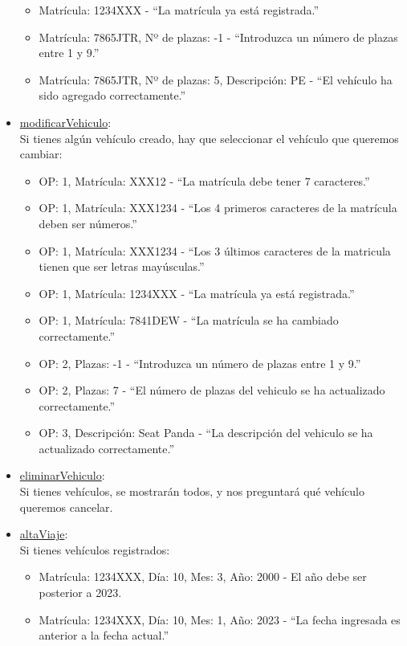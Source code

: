 \begin{itemize}
\begin{itemize}
    \item Matrícula: 1234XXX - “La matrícula ya está registrada.”
    \item Matrícula: 7865JTR, Nº de plazas: -1 - “Introduzca un número de plazas entre 1 y 9.”
    \item Matrícula: 7865JTR, Nº de plazas: 5, Descripción: PE - “El vehículo ha sido agregado correctamente.”
  \end{itemize}
  \item \href{DOC_DOXYGEN/modificar_8c_source.html}{modificarVehiculo}:\\
  Si tienes algún vehículo creado, hay que seleccionar el vehículo que queremos cambiar:
  \begin{itemize}
    \item OP: 1, Matrícula: XXX12 - “La matrícula debe tener 7 caracteres.”
    \item OP: 1, Matrícula: XXX1234 - “Los 4 primeros caracteres de la matrícula deben ser números.”
    \item OP: 1, Matrícula: XXX1234 - “Los 3 últimos caracteres de la matricula tienen que ser letras mayúsculas.”
    \item OP: 1, Matrícula: 1234XXX - “La matrícula ya está registrada.”
    \item OP: 1, Matrícula: 7841DEW - “La matrícula se ha cambiado correctamente.”
    \item OP: 2, Plazas: -1 - “Introduzca un número de plazas entre 1 y 9.”
    \item OP: 2, Plazas: 7 - “El número de plazas del vehiculo se ha actualizado correctamente.”
    \item OP: 3, Descripción: Seat Panda - “La descripción del vehiculo se ha actualizado correctamente.”
  \end{itemize}
  \item \href{DOC_DOXYGEN/eliminar_8c_source.html}{eliminarVehiculo}:\\
  Si tienes vehículos, se mostrarán todos, y nos preguntará qué vehículo queremos cancelar.
  \item \href{DOC_DOXYGEN/escribir_8c_source.html}{altaViaje}:\\
  Si tienes vehículos registrados:
  \begin{itemize}
    \item Matrícula: 1234XXX, Día: 10, Mes: 3, Año: 2000 - El año debe ser posterior a 2023.
    \item Matrícula: 1234XXX, Día: 10, Mes: 1, Año: 2023 - “La fecha ingresada es anterior a la fecha actual.”

\end{itemize}
\end{itemize}
